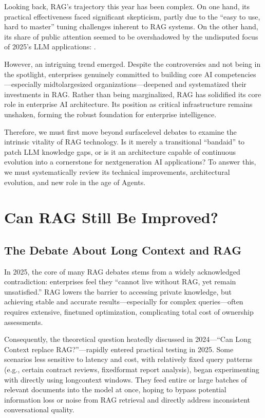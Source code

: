 \documentclass[letterpaper,10pt,english]{sphinxmanual}
\begin{document}
\sphinxAtStartPar
Looking back, RAG’s trajectory this year has been complex. On one hand,
its practical effectiveness faced significant skepticism, partly due to
the “easy to use, hard to master” tuning challenges inherent to RAG
systems. On the other hand, its share of public attention seemed to be
overshadowed by the undisputed focus of 2025’s LLM applications: .

\sphinxAtStartPar
However, an intriguing trend emerged. Despite the controversies and not
being in the spotlight, enterprises genuinely committed to building core
AI competencies—especially mid\sphinxhyphen{}to\sphinxhyphen{}large\sphinxhyphen{}sized organizations—deepened and
systematized their investments in RAG. Rather than being marginalized,
RAG has solidified its core role in enterprise AI architecture. Its
position as critical infrastructure remains unshaken, forming the robust
foundation for enterprise intelligence.

\sphinxAtStartPar
Therefore, we must first move beyond surface\sphinxhyphen{}level debates to examine
the intrinsic vitality of RAG technology. Is it merely a transitional
“band\sphinxhyphen{}aid” to patch LLM knowledge gaps, or is it an architecture capable
of continuous evolution into a cornerstone for next\sphinxhyphen{}generation AI
applications? To answer this, we must systematically review its
technical improvements, architectural evolution, and new role in the age
of Agents.


\section{Can RAG Still Be Improved?}
\label{\detokenize{blog-dec-2025:can-rag-still-be-improved}}

\subsection{The Debate About Long Context and RAG}
\label{\detokenize{blog-dec-2025:the-debate-about-long-context-and-rag}}
\sphinxAtStartPar
In 2025, the core of many RAG debates stems from a widely acknowledged
contradiction: enterprises feel they “cannot live without RAG, yet
remain unsatisfied.” RAG lowers the barrier to accessing private
knowledge, but achieving stable and accurate results—especially for
complex queries—often requires extensive, fine\sphinxhyphen{}tuned optimization,
complicating total cost of ownership assessments.

\sphinxAtStartPar
Consequently, the theoretical question heatedly discussed in 2024—“Can
Long Context replace RAG?”—rapidly entered practical testing in 2025.
Some scenarios less sensitive to latency and cost, with relatively fixed
query patterns (e.g., certain contract reviews, fixed\sphinxhyphen{}format report
analysis), began experimenting with directly using long\sphinxhyphen{}context windows.
They feed entire or large batches of relevant documents into the model
at once, hoping to bypass potential information loss or noise from RAG
retrieval and directly address inconsistent conversational quality.
\end{document}
